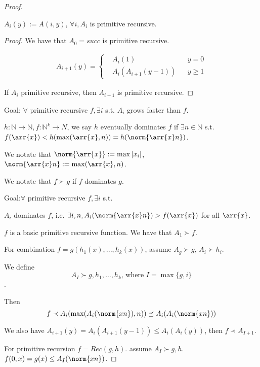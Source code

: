 \begin{proof}

\begin{lemma}
$A_i(y) := A(i,y)$, $\forall i, A_i$ is primitive recursive.
\end{lemma}

\begin{proof}
We have that $A_0 =succ$ is primitive recursive.

\begin{align*}
A_{i+1}(y) = \left\{
    \begin{aligned}
        & A_i(1) && y=0 \\
        & A_i(A_{i+1}(y-1)) && y \ge 1
    \end{aligned}
\right.
\end{align*}

If $A_i$ primitive recursive, then $A_{i+1}$ is primitive recursive.
\end{proof}


Goal: $\forall$ primitive recursive $f,\exists
i$ s.t. $A_i$ grows faster than $f$.

\begin{definition}[dominate]
$h: \mathbb{N} \rightarrow \mathbb{N}, f:\mathbb{N}^k \rightarrow N$, we say $h$ eventually dominates $f$ if $\exists n \in \mathbb{N}$ s.t. $f(\arr{x}) < h(\max(\arr{x},n)) = h(\norm{\arr{x}n})$.

We notate that $\norm{\arr{x}} := \max |x_i|$, $\norm{\arr{x}n} := \max(\arr{x}, n)$.

We notate that $f \succ g$ if $f$ dominates $g$.
\end{definition}

Goal:$\forall$ primitive recursive $f,\exists
i$ s.t. 

$A_i$ dominates $f$, i.e. $\exists i,n, A_i(\norm{\arr{x}n}) > f(\arr{x})$ for all $\arr{x}$.

$f$ is a basic primitive recursive function. We have that $A_1 \succ f$.

For combination $f=g(h_1(x), ..., h_k(x))$, assume $A_g \succ g$, $A_i \succ h_i$.

We define $$A_I \succ g, h_1, \dots, h_k\text{, where }I = \max\{g, i\}$$.

Then $$f \prec A_i(\max(A_i(\norm{xn}),n)) \preceq A_i(A_i(\norm{xn}))$$

We also have $A_{i+1}(y) = A_i(A_{i+1}(y-1)) \le A_i(A_i(y))$, then $f \prec A_{I+1}$.

For primitive recursion $f = Rec(g,h)$. assume $A_I \succ g,h$. $f(0,x) = g(x) \le A_I(\norm{xn})$.


\end{proof}
